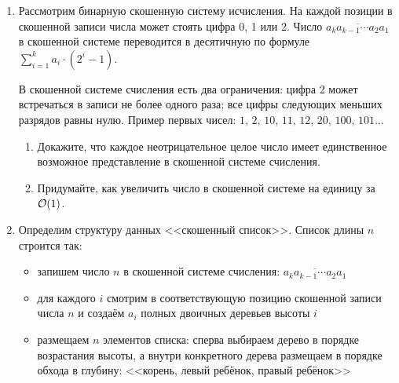 \begin{enumerate}
  \item
    Рассмотрим бинарную скошенную систему исчисления. На каждой
    позиции в скошенной записи числа может стоять цифра 0, 1 или
    2. Число $\overline{a_k a_{k-1} \cdots a_2 a_1}$ в скошенной системе
    переводится в десятичную по формуле $\sum_{i = 1}^k a_i \cdot (2^i - 1)$.

    В скошенной системе счисления есть два ограничения: цифра 2 может
    встречаться в записи не более одного раза; все цифры следующих
    меньших разрядов равны нулю.  Пример первых чисел:
    $1,\,2,\,10,\,11,\,12,\,20,\,100,\,101\dots$

    \begin{enumerate}
      \item Докажите, что каждое неотрицательное целое число имеет
        единственное возможное представление в скошенной системе счисления.
      \item Придумайте, как увеличить число в скошенной системе на
        единицу за $\mathcal{O}(1)$.
    \end{enumerate}

  \item
    Определим структуру данных <<скошенный список>>. Список длины $n$ строится так:
    \begin{itemize}
		\item запишем число $n$ в скошенной системе счисления: $\overline{a_k a_{k-1} \cdots a_2 a_1}$
		\item для каждого $i$ смотрим в соответствующую позицию скошенной записи числа $n$ и создаём $a_i$ полных двоичных деревьев высоты $i$
		\item размещаем $n$ элементов списка: сперва выбираем дерево в порядке возрастания высоты, а внутри конкретного дерева размещаем в порядке обхода в глубину: <<корень, левый ребёнок, правый ребёнок>>
	\end{itemize}


\end{enumerate}
